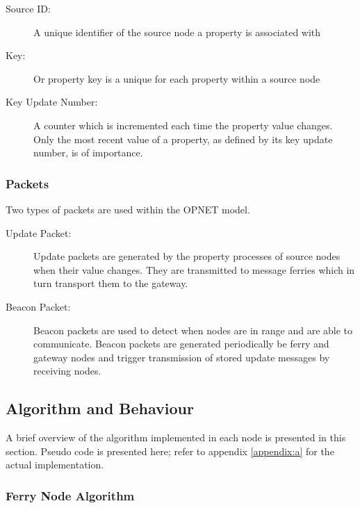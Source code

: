 \begin{description}
\item[Source ID: ] A unique identifier of the source node a property is associated with
\item[Key: ] Or property key is a unique for each property within a source node
\item[Key Update Number: ] A counter which is incremented each time the property value changes. 
Only the most recent value of a property, as defined by its key update number, is of importance.
\end{description}

\subsubsection{Packets}

Two types of packets are used within the OPNET model.

\begin{description}
\item[Update Packet: ]
Update packets are generated by the property processes of source nodes when their value changes.
They are transmitted to message ferries which in turn transport them to the gateway.
\item[Beacon Packet: ] 
Beacon packets are used to detect when nodes are in range and are able to communicate.
Beacon packets are generated periodically be ferry and gateway nodes and trigger transmission of stored update messages by receiving nodes.
\end{description}

\subsection{Algorithm and Behaviour}
\label{sec:algorithm}

A brief overview of the algorithm implemented in each node is presented in this section.
Pseudo code is presented here; refer to appendix \ref{appendix:a} for the actual implementation.

\subsubsection{Ferry Node Algorithm}

